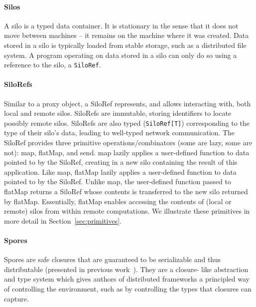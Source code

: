 \documentclass{sigplanconf}
\theoremstyle{definition}
\theoremstyle{definition}
\begin{document}
\paragraph{Silos}
A silo is a typed data container. It is stationary in the sense that it does
not move between machines -- it remains on the machine where it was created.
Data stored in a silo is typically loaded from stable storage, such as a
distributed file system. A program operating on data stored in a silo can only
do so using a reference to the silo, a \verb|SiloRef|.

\paragraph{SiloRefs}
Similar to a proxy object, a SiloRef represents, and allows interacting with,
both local and remote silos. SiloRefs are immutable, storing identifiers to
locate possibly remote silos. SiloRefs are also typed (\verb|SiloRef[T]|)
corresponding to the type of their silo's data, leading to well-typed network
communication. The SiloRef provides three primitive operations/combinators
(some are lazy, some are not): map, flatMap, and send. map lazily applies a
user-defined function to data pointed to by the SiloRef, creating in a new
silo containing the result of this application. Like map, flatMap lazily
applies a user-defined function to data pointed to by the SiloRef. Unlike map,
the user-defined function passed to flatMap returns a SiloRef whose contents
is transferred to the new silo returned by flatMap. Essentially, flatMap
enables accessing the contents of (local or remote) silos from within remote
computations. We illustrate these primitives in more detail in Section~\ref{sec:primitives}.

\paragraph{Spores}
Spores are safe closures that are guaranteed to be serializable and thus
distributable (presented in previous work~\cite{Spores}). They  are a closure-
like abstraction and type system which gives authors of distributed frameworks
a principled way of controlling the environment, such as by controlling the
types that closures can capture.
\end{document}
